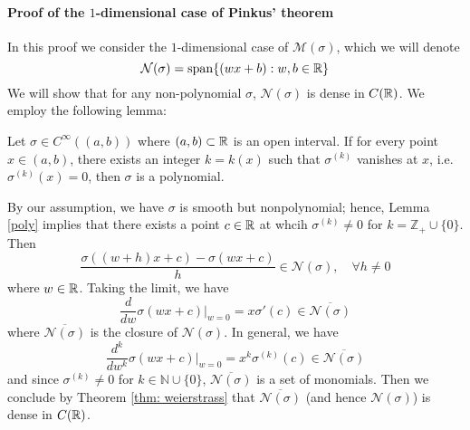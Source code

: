\paragraph{Proof of the $1$-dimensional case of Pinkus' theorem} In this proof we consider the $1$-dimensional case of $\mathcal{M}(\sigma)$, which we will denote
\[ \mathcal{N}(\sigma) = \operatorname{span}\{(wx+b): w, b \in \mathbb{R}\} \]
We will show that for any non-polynomial $\sigma$, $\mathcal{N}(\sigma)$ is dense in $C(\mathbb{R})$. We employ the following lemma:
\begin{lemma}
  \label{poly}
  Let $\sigma \in C^\infty((a, b))$ where $(a, b) \subset \mathbb{R}$ is an open interval. If for every point $x \in (a, b)$, there exists an integer $k = k(x)$ such that $\sigma^{(k)}$ vanishes at $x$, i.e. $\sigma^{(k)}(x) =0$, then $\sigma$ is a polynomial. 
\end{lemma}
By our assumption, we have $\sigma$ is smooth but nonpolynomial; hence, Lemma \autoref{poly} implies that there exists a point $c \in \mathbb{R}$ at whcih $\sigma^{(k)} \not= 0$ for $k = \mathbb{Z}_+ \cup \{0\}$. Then 
\[ \frac{\sigma((w + h)x + c) - \sigma(wx + c)}{h} \in \mathcal{N}(\sigma), \quad \forall h \not= 0\]
where $w \in \mathbb{R}$. Taking the limit, we have 
\[ \frac{d}{dw}\sigma(wx + c) \Big\vert_{w = 0} = x\sigma'(c) \in \overline{\mathcal{N}(\sigma)} \]
where $\overline{\mathcal{N}(\sigma)}$ is the closure of $\mathcal{N}(\sigma)$. In general, we have
\[ \frac{d^k}{dw^k} \sigma(wx + c) \Big\vert_{w=0} = x^k \sigma^{(k)}(c) \in \overline{\mathcal{N}(\sigma)}\]
and since $\sigma^{(k)} \not=0$ for $k \in \mathbb{N}\cup \{0\}$, $\overline{\mathcal{N}(\sigma)}$ is a set of monomials. Then we conclude by Theorem \ref{thm: weierstrass} that $\overline{\mathcal{N}(\sigma)}$ (and hence $\mathcal{N}(\sigma)$) is dense in $C(\mathbb{R})$.
